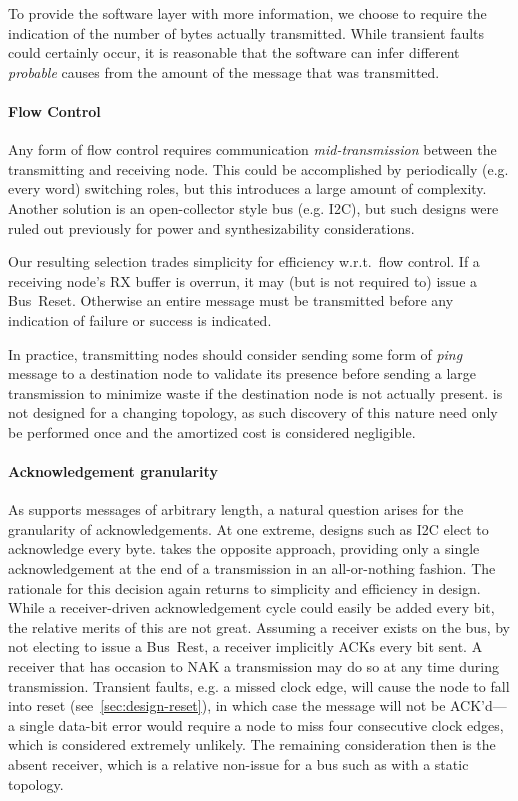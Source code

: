 To provide the software layer with more information, we choose to require the
indication of the number of bytes actually transmitted. While transient faults
could certainly occur, it is reasonable that the software can infer different
{\em probable} causes from the amount of the message that was transmitted.

\paragraph{Flow Control}
Any form of flow control requires communication {\em mid-transmission} between
the transmitting and receiving node. This could be accomplished by
periodically (e.g. every word) switching roles, but this introduces a large
amount of complexity. Another solution is an open-collector style bus (e.g.
I2C), but such designs were ruled out previously for power and
synthesizability considerations.

Our resulting selection trades simplicity for efficiency w.r.t.\ flow control.
If a receiving node's RX buffer is overrun, it may (but is not required to)
issue a Bus~Reset. Otherwise an entire message must be transmitted before any
indication of failure or success is indicated.

In practice, transmitting nodes should consider sending some form of {\em
ping} message to a destination node to validate its presence before sending a
large transmission to minimize waste if the destination node is not actually
present. \bus is not designed for a changing topology, as such discovery of
this nature need only be performed once and the amortized cost is considered
negligible.

\paragraph{Acknowledgement granularity}
As \bus supports messages of arbitrary length, a natural question arises for
the granularity of acknowledgements. At one extreme, designs such as I2C elect
to acknowledge every byte. \bus takes the opposite approach, providing only a
single acknowledgement at the end of a transmission in an all-or-nothing
fashion. The rationale for this decision again returns to simplicity and
efficiency in design. While a receiver-driven acknowledgement cycle could
easily be added every  bit, the relative merits of this are not great.
Assuming a receiver exists on the bus, by not electing to issue a Bus~Rest, a
receiver implicitly ACKs every bit sent. A receiver that has occasion to NAK a
transmission may do so at any time during transmission. Transient faults, e.g.
a missed clock edge, will cause the node to fall into reset
(see~\ref{sec:design-reset}), in which case the message will not be ACK'd---a
single data-bit error would require a node to miss four consecutive clock
edges, which is considered extremely unlikely. The remaining consideration
then is the absent receiver, which is a relative non-issue for a bus such as
\bus with a static topology.

